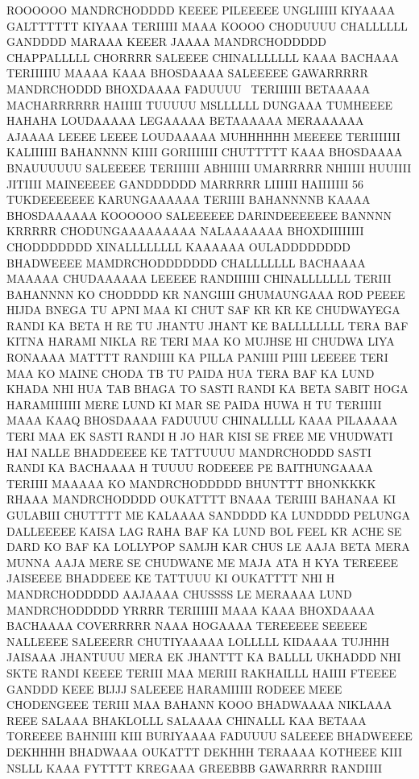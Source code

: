 ROOOOOO MANDRCHODDDD KEEEE PILEEEEE
UNGLIIIII KIYAAAA GALTTTTTT KIYAAA TERIIIII MAAA KOOOO CHODUUUU
CHALLLLLL GANDDDD MARAAA KEEER JAAAA 
MANDRCHODDDDD CHAPPALLLLL CHORRRR SALEEEE CHINALLLLLLL KAAA BACHAAA
TERIIIIIU MAAAA KAAA BHOSDAAAA 
SALEEEEE GAWARRRRR MANDRCHODDD BHOXDAAAA FADUUUU  TERIIIIII
BETAAAAA MACHARRRRRR HAIIIII TUUUUU 
MSLLLLLL DUNGAAA TUMHEEEE HAHAHA
LOUDAAAAA LEGAAAAA 
BETAAAAAA MERAAAAAA AJAAAA LEEEE LEEEE 
LOUDAAAAA MUHHHHHH MEEEEE
TERIIIIIII KALIIIIII BAHANNNN KIIII GORIIIIIII CHUTTTTT
KAAA BHOSDAAAA BNAUUUUUU SALEEEEE
TERIIIIII ABHIIIII UMARRRRR NHIIIII HUUIIII 
JITIIII MAINEEEEE GANDDDDDD MARRRRR LIIIIII HAIIIIIII
56 TUKDEEEEEEE KARUNGAAAAAA 
TERIIII BAHANNNNB KAAAA BHOSDAAAAAA KOOOOOO SALEEEEEE
DARINDEEEEEEE BANNNN KRRRRR CHODUNGAAAAAAAAA NALAAAAAAA
BHOXDIIIIIIII CHODDDDDDD XINALLLLLLLL KAAAAAA OULADDDDDDDD 
BHADWEEEE MAMDRCHODDDDDDD
CHALLLLLLL BACHAAAA MAAAAA CHUDAAAAAA LEEEEE RANDIIIIII CHINALLLLLLL
TERIII BAHANNNN KO CHODDDD KR NANGIIII GHUMAUNGAAA ROD PEEEE
HIJDA BNEGA TU APNI MAA KI CHUT SAF KR KR KE CHUDWAYEGA
RANDI KA BETA H RE TU JHANTU JHANT KE BALLLLLLLL
TERA BAF KITNA HARAMI NIKLA RE TERI MAA KO MUJHSE HI CHUDWA LIYA 
RONAAAA MATTTT RANDIIII KA PILLA PANIIII PIIII LEEEEE
TERI MAA KO MAINE CHODA TB TU PAIDA HUA 
TERA BAF KA LUND KHADA NHI HUA TAB
BHAGA TO SASTI RANDI KA BETA SABIT HOGA HARAMIIIIIII
MERE LUND KI MAR SE PAIDA HUWA H TU
TERIIIII MAAA KAAQ BHOSDAAAA FADUUUU 
CHINALLLLL KAAA PILAAAAA
TERI MAA EK SASTI RANDI H 
JO HAR KISI SE FREE ME VHUDWATI HAI NALLE
BHADDEEEE KE TATTUUUU MANDRCHODDD 
SASTI RANDI KA BACHAAAA H TUUUU
RODEEEE PE BAITHUNGAAAA 
TERIIII MAAAAA KO MANDRCHODDDDD
BHUNTTT BHONKKKK RHAAA 
MANDRCHODDDD OUKATTTT BNAAA
TERIIII BAHANAA KI GULABIII CHUTTTT 
ME KALAAAA SANDDDD KA LUNDDDD PELUNGA DALLEEEEE
KAISA LAG RAHA BAF KA LUND 
BOL FEEL KR ACHE SE DARD KO BAF KA
LOLLYPOP SAMJH KAR CHUS LE AAJA 
BETA MERA MUNNA AAJA
MERE SE CHUDWANE ME MAJA ATA H KYA 
TEREEEE JAISEEEE BHADDEEE KE TATTUUU KI OUKATTTT NHI H 
MANDRCHODDDDD AAJAAAA CHUSSSS LE MERAAAA LUND MANDRCHODDDDD 
YRRRR TERIIIIII MAAA KAAA BHOXDAAAA 
BACHAAAA COVERRRRR NAAA HOGAAAA TEREEEEE SEEEEE NALLEEEE 
SALEEERR CHUTIYAAAAA LOLLLLL KIDAAAA
TUJHHH JAISAAA JHANTUUU 
MERA EK JHANTTT KA BALLLL UKHADDD NHI SKTE RANDI KEEEE
TERIII MAA MERIII RAKHAILLL HAIIII 
FTEEEE GANDDD KEEE BIJJJ SALEEEE HARAMIIIII
RODEEE MEEE CHODENGEEE TERIII MAA BAHANN KOOO
BHADWAAAA NIKLAAA REEE SALAAA 
BHAKLOLLL SALAAAA CHINALLL KAA BETAAA
TOREEEE BAHNIIII KIII 
BURIYAAAA FADUUUU SALEEEE BHADWEEEE 
DEKHHHH BHADWAAA OUKATTT 
DEKHHH TERAAAA
KOTHEEE KIII NSLLL KAAA FYTTTT 
KREGAAA GREEBBB GAWARRRR RANDIIII 
